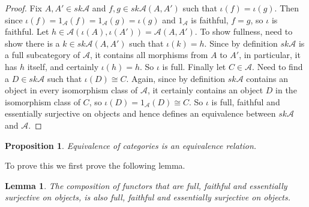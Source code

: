\documentclass[11pt]{article}
\theoremstyle{definition}
\theoremstyle{plain}
\theoremstyle{plain}
\newtheorem{prop}{Proposition}
\theoremstyle{plain}
\newtheorem*{lem}{Lemma}
\begin{document}
\begin{proof}
Fix $A,A'\in sk\mathscr{A}$ and $f,g\in sk\mathscr{A}(A,A')$ such that $\iota(f)=\iota(g)$. Then since $\iota(f)=1_{\mathscr{A}}(f)=1_{\mathscr{A}}(g)=\iota(g)$ and $1_{\mathscr{A}}$ is faithful, $f=g$, so $\iota$ is faithful. Let $h\in\mathscr{A}(\iota(A),\iota(A'))=\mathscr{A}(A,A')$. To show fullness, need to show there is a $k\in sk\mathscr{A}(A,A')$ such that $\iota(k)=h$. Since by definition $sk\mathscr{A}$ is a full subcategory of $\mathscr{A}$, it contains all morphisms from $A$ to $A'$, in particular, it has $h$ itself, and certainly $\iota(h)=h$. So $\iota$ is full. Finally let $C\in\mathscr{A}$. Need to find a $D \in sk\mathscr{A}$ such that $\iota(D)\cong C$. Again, since by definition $sk\mathscr{A}$ contains an object in every isomorphism class of $\mathscr{A}$, it certainly contains an object $D$ in the isomorphism class of $C$, so $\iota(D)=1_{\mathscr{A}}(D)\cong C$. So $\iota$ is full, faithful and essentially surjective on objects and hence defines an equivalence between $sk\mathscr{A}$ and $\mathscr{A}$.
\end{proof}

\begin{prop}
\label{prop: eqrel}
Equivalence of categories is an equivalence relation.
\end{prop}

To prove this we first prove the following lemma.

\begin{lem}
The composition of functors that are full, faithful and essentially surjective on objects, is also full, faithful and essentially surjective on objects.
\end{lem}
\end{document}
